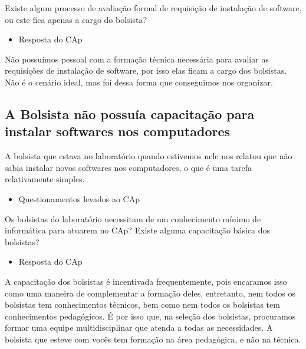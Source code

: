 Existe algum processo de avaliação formal de requisição de instalação de software, ou este fica apenas a cargo do bolsista?

\begin{itemize}
    \item Resposta do CAp
\end{itemize}

Não possuímos pessoal com a formação técnica necessária para avaliar as requisições de instalação de software, por isso elas ficam a cargo dos bolsistas. Não é o cenário ideal, mas foi dessa forma que conseguimos nos organizar.

\subsection{A Bolsista não possuía capacitação para instalar softwares nos computadores}\label{sec:LABEL_CHP_REL_SEC_PROBS_SUBSEC_INST_SOFT}

A bolsista que estava no laboratório quando estivemos nele nos relatou que não sabia instalar novos softwares nos computadores, o que é uma tarefa relativamente simples.

\begin{itemize}
    \item Questionamentos levados ao CAp
\end{itemize}

Os bolsistas do laboratório necessitam de um conhecimento mínimo de informática para atuarem no CAp? Existe alguma capacitação básica dos bolsistas?

\begin{itemize}
    \item Resposta do CAp
\end{itemize}

A capacitação dos bolsistas é incentivada frequentemente, pois encaramos isso como uma maneira de complementar a formação deles, entretanto, nem todos os bolsistas tem conhecimentos técnicos, bem como nem todos os bolsistas tem conhecimentos pedagógicos. É por isso que, na seleção dos bolsistas, procuramos formar uma equipe multidisciplinar que atenda a todas as necessidades. A bolsista que esteve com vocês tem formação na área pedagógica, e não na técnica.


